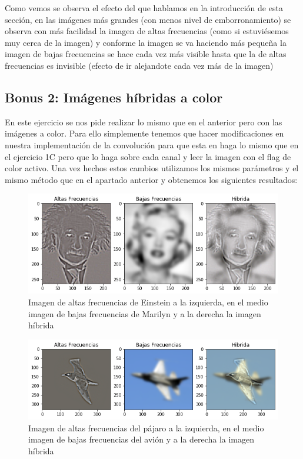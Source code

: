 \documentclass[12pt,spanish]{article}
\begin{document}
Como vemos se observa el efecto del que hablamos en la introducción de esta sección, en las imágenes más grandes (con menos nivel de emborronamiento) se observa con más facilidad la imagen de altas frecuencias (como si estuviésemos muy cerca de la imagen) y conforme la imagen se va haciendo más pequeña la imagen de bajas frecuencias se hace cada vez más visible hasta que la de altas frecuencias es invisible (efecto de ir alejandote cada vez más de la imagen)


\subsection{Bonus 2: Imágenes híbridas a color}
En este ejercicio se nos pide realizar lo mismo que en el anterior pero con las imágenes a color. Para ello simplemente tenemos que hacer modificaciones en nuestra implementación de la convolución para que esta en haga lo mismo que en el ejercicio 1C pero que lo haga sobre cada canal y leer la imagen con el flag de color activo. Una vez hechos estos cambios utilizamos los mismos parámetros y  el mismo método que en el apartado anterior  y obtenemos los siguientes resultados:

\begin{figure}[H]
	\includegraphics[width=\textwidth]{./imagenes_memoria/b2a1}
	\caption{Imagen de altas frecuencias de Einstein a la izquierda, en el medio imagen de bajas frecuencias de Marilyn y a la derecha la imagen híbrida}
	\label{bonus2a1}
\end{figure}

\begin{figure}[H]
	\includegraphics[width=\textwidth]{./imagenes_memoria/b2b1}
	\caption{Imagen de altas frecuencias del pájaro a la izquierda, en el medio imagen de bajas frecuencias del avión y a la derecha la imagen híbrida}
	\label{bonus2b1}
\end{figure}
\end{document}
